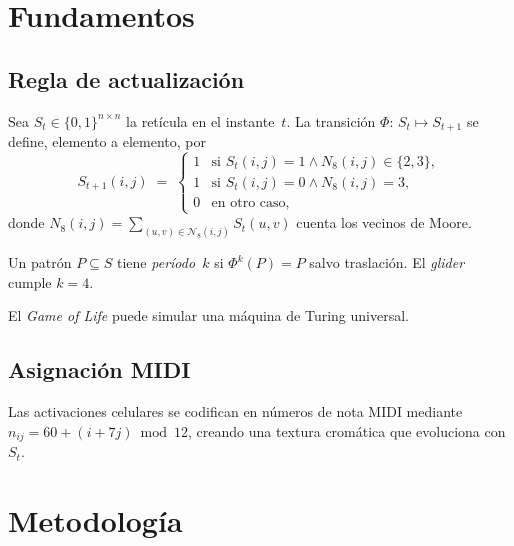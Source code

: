 \documentclass{report}
\begin{document}
\chapter{Fundamentos}
\section{Regla de actualización}
Sea \(S_t\in\{0,1\}^{n\times n}\) la retícula en el instante~\(t\).  
La transición \(\Phi:\,S_t\mapsto S_{t+1}\) se define, elemento a elemento, por
\begin{equation}
  S_{t+1}(i,j) \;=\;
  \begin{cases}
    1 &\text{si } S_t(i,j)=1 \wedge N_8(i,j)\in\{2,3\},\\
    1 &\text{si } S_t(i,j)=0 \wedge N_8(i,j)=3,\\
    0 &\text{en otro caso},
  \end{cases}
  \label{eq:gol}
\end{equation}
donde \(N_8(i,j)=\sum_{(u,v)\in\mathcal N_8(i,j)}S_t(u,v)\) cuenta los vecinos
de Moore.

\begin{definition}
Un patrón \(P\subseteq S\) tiene \emph{período~\(k\)} si
\(\Phi^k(P)=P\) salvo traslación.  El \emph{glider} cumple \(k=4\).
\end{definition}

\begin{theorem}
El \emph{Game of Life} puede simular una máquina de Turing universal.
\end{theorem}

\section{Asignación MIDI}
Las activaciones celulares se codifican en números de nota MIDI mediante
\(
  n_{ij} = 60 + (i + 7j)\bmod 12
\),
creando una textura cromática que evoluciona con \(S_t\).

\chapter{Metodología}
\end{document}
